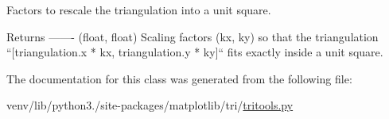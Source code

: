 \begin{DoxyVerb}Factors to rescale the triangulation into a unit square.

Returns
-------
(float, float)
    Scaling factors (kx, ky) so that the triangulation
    ``[triangulation.x * kx, triangulation.y * ky]``
    fits exactly inside a unit square.
\end{DoxyVerb}
 

The documentation for this class was generated from the following file\+:\begin{DoxyCompactItemize}
\item 
venv/lib/python3./site-\/packages/matplotlib/tri/\hyperlink{tritools_8py}{tritools.\+py}\end{DoxyCompactItemize}
